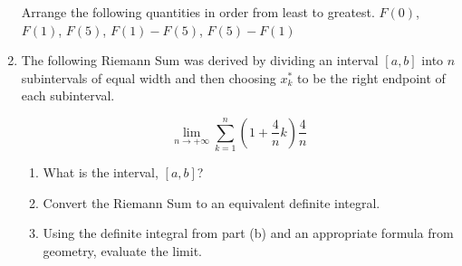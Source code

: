 \documentclass[12pt]{article}
\newif\ifans
\begin{document}
\begin{enumerate}
Arrange the following quantities in order from least to greatest. $F(0)$, $F(1)$, $F(5)$, $F(1)-F(5)$, $F(5)-F(1)$

\ifans{\fbox{$F(5)-F(1)<F(5)<F(0)<F(1)<F(1)-F(5)$}} \fi

\item The following Riemann Sum was derived by dividing an interval $[a,b]$ into $n$ subintervals of equal width and then choosing $x_k^*$ to be the right endpoint of each subinterval.

$$\lim_{n \rightarrow +\infty} \sum_{k=1}^n{\left(1+\frac{4}{n}k\right)\frac{4}{n}}$$

\begin{enumerate}

\item What is the interval, $[a,b]$?

\ifans{\fbox{If we consider $f(x)=x$, then the interval is $[1,5]$.}} \fi

\item Convert the Riemann Sum to an equivalent definite integral.

\ifans{\fbox{$\lim_{n \rightarrow +\infty} \sum_{k=1}^n{\left(1+\frac{4}{n}k\right)\frac{4}{n}}=\int_1^5{x} \,dx$}} \fi

\item Using the definite integral from part (b) and an appropriate formula from geometry, evaluate the limit.

\ifans{\fbox{12}} \fi

\end{enumerate}

\ifans{{\bf NOTE:} In number 18, there are many correct answers.  For example, we could have considered $f(x)=1+x$.  In that case, $[a,b]=[0,4]$ and $\lim_{n \rightarrow +\infty} \sum_{k=1}^n{\left(1+\frac{4}{n}k\right)\frac{4}{n}}=\int_0^4{(1+x)} \,dx$.  The value of this definite integral is also 12.} \fi

\end{enumerate}
\end{document}
